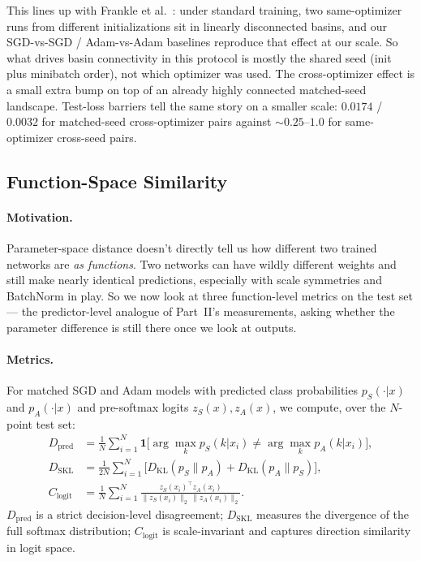 \documentclass[11pt]{article}
\begin{document}
This lines up with Frankle et al.~\cite{frankle2020linear}: under standard training, two same-optimizer runs from different initializations sit in linearly disconnected basins, and our SGD-vs-SGD / Adam-vs-Adam baselines reproduce that effect at our scale. So what drives basin connectivity in this protocol is mostly the shared seed (init plus minibatch order), not which optimizer was used. The cross-optimizer effect is a small extra bump on top of an already highly connected matched-seed landscape. Test-loss barriers tell the same story on a smaller scale: $0.0174$ / $0.0032$ for matched-seed cross-optimizer pairs against $\sim 0.25$--$1.0$ for same-optimizer cross-seed pairs.

\FloatBarrier

\subsection{Function-Space Similarity}
\label{sec:function-space}

\paragraph{Motivation.} Parameter-space distance doesn't directly tell us how different two trained networks are \emph{as functions}. Two networks can have wildly different weights and still make nearly identical predictions, especially with scale symmetries and BatchNorm in play. So we now look at three function-level metrics on the test set --- the predictor-level analogue of Part~II's measurements, asking whether the parameter difference is still there once we look at outputs.

\paragraph{Metrics.} For matched SGD and Adam models with predicted class probabilities $p_S(\cdot|x)$ and $p_A(\cdot|x)$ and pre-softmax logits $z_S(x), z_A(x)$, we compute, over the $N$-point test set:
\begin{align}
D_{\mathrm{pred}} &= \frac{1}{N}\sum_{i=1}^N \mathbf{1}\!\big[\arg\max_k p_S(k|x_i)\ne \arg\max_k p_A(k|x_i)\big],\\
D_{\mathrm{SKL}} &= \frac{1}{2N}\sum_{i=1}^N \big[D_{\mathrm{KL}}(p_S\|p_A) + D_{\mathrm{KL}}(p_A\|p_S)\big],\\
C_{\mathrm{logit}} &= \frac{1}{N}\sum_{i=1}^N \frac{z_S(x_i)^\top z_A(x_i)}{\|z_S(x_i)\|_2\,\|z_A(x_i)\|_2}.
\end{align}
$D_{\mathrm{pred}}$ is a strict decision-level disagreement; $D_{\mathrm{SKL}}$ measures the divergence of the full softmax distribution; $C_{\mathrm{logit}}$ is scale-invariant and captures direction similarity in logit space.
\end{document}
